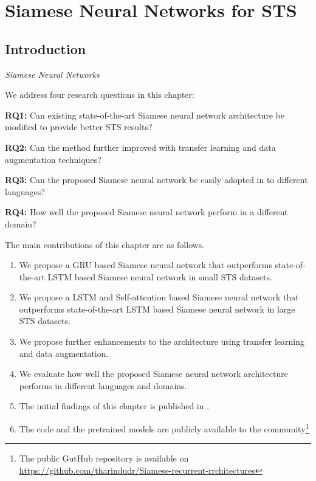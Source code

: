 \chapter{\label{cha:sts_siamese_neural_networks}Siamese Neural Networks for STS}

\section{Introduction}
\cite{ranasinghe-etal-2019-semantic}
\textit{Siamese Neural Networks}



We address four research questions in this chapter:

\textbf{RQ1:} Can existing state-of-the-art Siamese neural network architecture be modified to provide better STS results?

\textbf{RQ2:} Can the method further improved with transfer learning and data augmentation techniques?

\textbf{RQ3:} Can the proposed Siamese neural network be easily adopted in to different languages?

\textbf{RQ4:} How well the proposed Siamese neural network perform in a different domain? 


The main contributions of this chapter are as follows.

\begin{enumerate}
	\item We propose a GRU based Siamese neural network that outperforms state-of-the-art LSTM based Siamese neural network in small STS datasets. 
	
	\item We propose a LSTM and Self-attention based Siamese neural network that outperforms state-of-the-art LSTM based Siamese neural network in large STS datasets.
	
	\item We propose further enhancements to the architecture using transfer learning and data augmentation.  
	
	\item We evaluate how well the proposed Siamese neural network architecture performs in different languages and domains. 
	
	\item The initial findings of this chapter is published in \citet{ranasinghe-etal-2019-semantic}. 
	
	\item The code and the pretrained models are publicly available to the community\footnote{The public GutHub repository is available on \url{https://github.com/tharindudr/Siamese-recurrent-rrchitectures}}
\end{enumerate}

